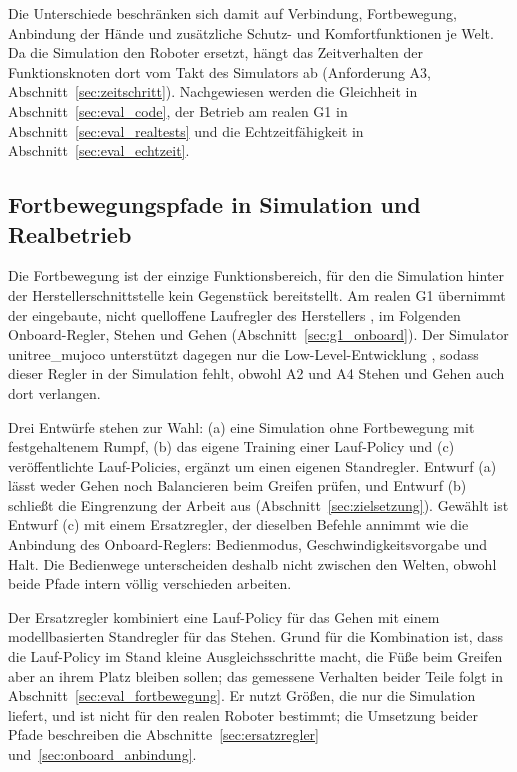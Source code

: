 Die Unterschiede beschränken sich damit auf Verbindung, Fortbewegung, Anbindung der Hände und zusätzliche Schutz- und Komfortfunktionen je Welt.
Da die Simulation den Roboter ersetzt, hängt das Zeitverhalten der Funktionsknoten dort vom Takt des Simulators ab (Anforderung A3, Abschnitt~\ref{sec:zeitschritt}).
Nachgewiesen werden die Gleichheit in Abschnitt~\ref{sec:eval_code}, der Betrieb am realen G1 in Abschnitt~\ref{sec:eval_realtests} und die Echtzeitfähigkeit in Abschnitt~\ref{sec:eval_echtzeit}.

\subsection{Fortbewegungspfade in Simulation und Realbetrieb}
\label{sec:fortbewegungspfade}
Die Fortbewegung ist der einzige Funktionsbereich, für den die Simulation hinter der Herstellerschnittstelle kein Gegenstück bereitstellt.
Am realen G1 übernimmt der eingebaute, nicht quelloffene Laufregler des Herstellers \cite{Hu2026}, im Folgenden Onboard-Regler, Stehen und Gehen (Abschnitt~\ref{sec:g1_onboard}).
Der Simulator unitree\_mujoco unterstützt dagegen nur die Low-Level-Entwicklung \cite{UnitreeMujoco}, sodass dieser Regler in der Simulation fehlt, obwohl A2 und A4 Stehen und Gehen auch dort verlangen.

Drei Entwürfe stehen zur Wahl: (a) eine Simulation ohne Fortbewegung mit festgehaltenem Rumpf, (b) das eigene Training einer Lauf-Policy und (c) veröffentlichte Lauf-Policies, ergänzt um einen eigenen Standregler.
Entwurf (a) lässt weder Gehen noch Balancieren beim Greifen prüfen, und Entwurf (b) schließt die Eingrenzung der Arbeit aus (Abschnitt~\ref{sec:zielsetzung}).
Gewählt ist Entwurf (c) mit einem Ersatzregler, der dieselben Befehle annimmt wie die Anbindung des Onboard-Reglers: Bedienmodus, Geschwindigkeitsvorgabe und Halt.
Die Bedienwege unterscheiden deshalb nicht zwischen den Welten, obwohl beide Pfade intern völlig verschieden arbeiten.

Der Ersatzregler kombiniert eine Lauf-Policy für das Gehen mit einem modellbasierten Standregler für das Stehen.
Grund für die Kombination ist, dass die Lauf-Policy im Stand kleine Ausgleichsschritte macht, die Füße beim Greifen aber an ihrem Platz bleiben sollen; das gemessene Verhalten beider Teile folgt in Abschnitt~\ref{sec:eval_fortbewegung}.
Er nutzt Größen, die nur die Simulation liefert, und ist nicht für den realen Roboter bestimmt; die Umsetzung beider Pfade beschreiben die Abschnitte~\ref{sec:ersatzregler} und~\ref{sec:onboard_anbindung}.

